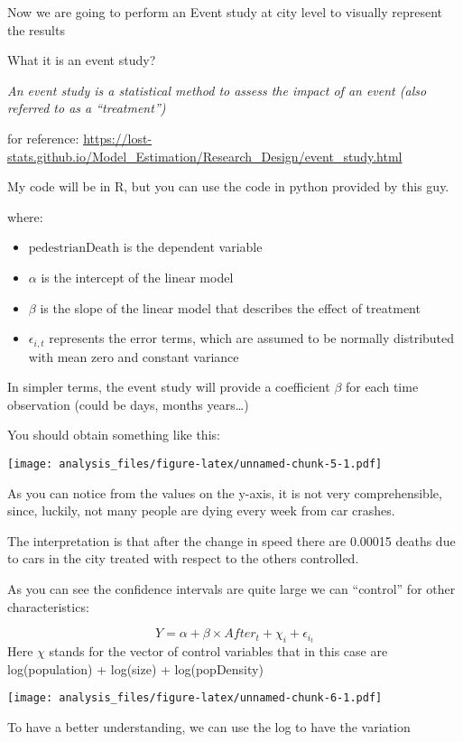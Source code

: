 \documentclass[
]{article}
\providecommand{\tightlist}{%
  \setlength{\itemsep}{0pt}\setlength{\parskip}{0pt}}
\begin{document}
Now we are going to perform an Event study at city level to visually
represent the results

What it is an event study?

\emph{An event study is a statistical method to assess the impact of an
event (also referred to as a ``treatment'')}

for reference:
\url{https://lost-stats.github.io/Model_Estimation/Research_Design/event_study.html}

My code will be in R, but you can use the code in python provided by
this guy.

where:

\begin{itemize}
\tightlist
\item
  \(\text{pedestrianDeath}\) is the dependent variable
\item
  \(\alpha\) is the intercept of the linear model
\item
  \(\beta\) is the slope of the linear model that describes the effect
  of treatment
\item
  \(\epsilon_{i,t}\) represents the error terms, which are assumed to be
  normally distributed with mean zero and constant variance
\end{itemize}

In simpler terms, the event study will provide a coefficient \(\beta\)
for each time observation (could be days, months years\ldots)

You should obtain something like this:

\texttt{[image: analysis\_files/figure-latex/unnamed-chunk-5-1.pdf]}

As you can notice from the values on the y-axis, it is not very
comprehensible, since, luckily, not many people are dying every week
from car crashes.

The interpretation is that after the change in speed there are 0.00015
deaths due to cars in the city treated with respect to the others
controlled.

As you can see the confidence intervals are quite large we can
``control'' for other characteristics:

\[ Y = \alpha + \beta \times After_t + \chi_{i} + \epsilon_{i_t} \] Here
\(\chi\) stands for the vector of control variables that in this case
are log(population) + log(size) + log(popDensity)

\texttt{[image: analysis\_files/figure-latex/unnamed-chunk-6-1.pdf]}

To have a better understanding, we can use the log to have the variation
\end{document}

